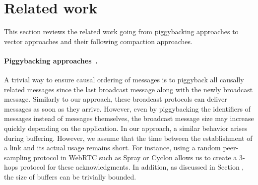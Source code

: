 
\section{Related work}
\label{sec:relatedwork}

This section reviews the related work going from piggybacking approaches to
vector approaches and their following compaction approaches.

\paragraph{Piggybacking
  approaches~\cite{birman1987reliable,hadzilacos1993fault}.}
A trivial way to ensure causal ordering of messages is to piggyback all causally
related messages since the last broadcast message along with the newly broadcast
message. Similarly to our approach, these broadcast protocols can deliver
messages as soon as they arrive.  However, even by piggybacking the identifiers
of messages instead of messages themselves, the broadcast message size may
increase quickly depending on the application. In our approach, a similar
behavior arises during buffering. However, we assume that the time between the
establishment of a link and its actual usage remains short. For instance, using
a random peer-sampling protocol in WebRTC such as Spray or Cyclon allows us to
create a 3-hops protocol for these acknowledgments. In addition, as discussed
in Section , the size of buffers can be trivially
bounded. 

